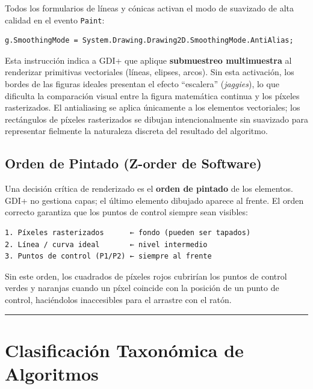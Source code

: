 \documentclass[
  spanish,
  a4paper,
  12pt,
]{article}
\newcommand{\passthrough}[1]{#1}
\begin{document}
Todos los formularios de líneas y cónicas activan el modo de suavizado
de alta calidad en el evento \passthrough{\lstinline!Paint!}:

\begin{lstlisting}
g.SmoothingMode = System.Drawing.Drawing2D.SmoothingMode.AntiAlias;
\end{lstlisting}

Esta instrucción indica a GDI+ que aplique \textbf{submuestreo
multimuestra} al renderizar primitivas vectoriales (líneas, elipses,
arcos). Sin esta activación, los bordes de las figuras ideales presentan
el efecto ``escalera'' (\emph{jaggies}), lo que dificulta la comparación
visual entre la figura matemática continua y los píxeles rasterizados.
El antialiasing se aplica únicamente a los elementos vectoriales; los
rectángulos de píxeles rasterizados se dibujan intencionalmente sin
suavizado para representar fielmente la naturaleza discreta del
resultado del algoritmo.

\subsection{Orden de Pintado (Z-order de
Software)}\label{orden-de-pintado-z-order-de-software}

Una decisión crítica de renderizado es el \textbf{orden de pintado} de
los elementos. GDI+ no gestiona capas; el último elemento dibujado
aparece al frente. El orden correcto garantiza que los puntos de control
siempre sean visibles:

\begin{lstlisting}
1. Píxeles rasterizados      ← fondo (pueden ser tapados)
2. Línea / curva ideal       ← nivel intermedio
3. Puntos de control (P1/P2) ← siempre al frente
\end{lstlisting}

Sin este orden, los cuadrados de píxeles rojos cubrirían los puntos de
control verdes y naranjas cuando un píxel coincide con la posición de un
punto de control, haciéndolos inaccesibles para el arrastre con el
ratón.

\begin{center}\rule{0.5\linewidth}{0.5pt}\end{center}

\section{Clasificación Taxonómica de
Algoritmos}\label{clasificaciuxf3n-taxonuxf3mica-de-algoritmos}
\end{document}
